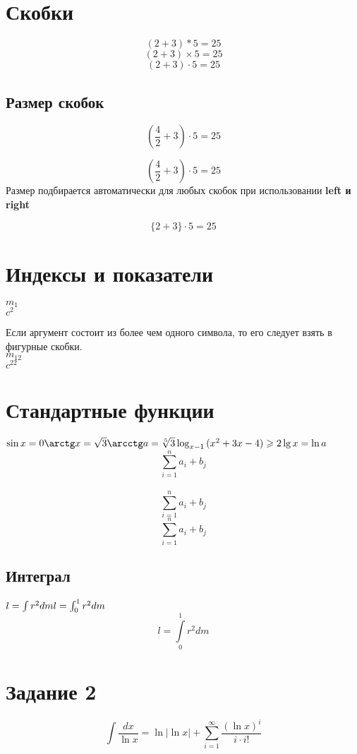 \documentclass[a4paper,12pt]{article} %
\begin{document}
\section {Скобки}

\[(2+3)*5=25 \]
\[(2+3)\times 5=25\]
\[(2+3) \cdot 5=25\]
\subsection*{Размер скобок}
\[(\frac{4}{2}+3) \cdot 5=25\]

\[\left(\frac{4}{2}+3\right) \cdot 5=25\] Размер подбирается автоматически для любых скобок при использовании \textbf{left и right}

\[\{2+3\} \cdot 5=25\]

\section {Индексы и показатели}
$m_1$\\
$c^2$

Если аргумент состоит из более чем одного символа, то его следует взять в фигурные скобки.\\
$m_{12}$\\
$c^{22}$\\

\section {Стандартные функции}
$\sin x=0\\
\arctg x=\sqrt{3}\\
\arcctg a=\sqrt[5]{3}\\
\log_{x-1}{(x^2+3x-4)}\geqslant2\\
\lg x=\ln a $\\
$$ \sum_{i=1}^{n}a_i+b_j $$ \\
\[\sum_{i=1}^{n}a_i+b_j\]
\begin{equation}
\sum_{i=1}^{n}a_i+b_j
\end{equation}

\subsection*{Интеграл}
$ l=\int r^2dm\\
l=\int_{0}^{1}r^2dm $ \\
\[l=\int\limits_{0}^{1}r^2dm\]


\section*{Задание 2}
\[\int\frac{dx}{\ln x} =\ln|\ln x|+ \sum_{i=1}^{\infty}\frac{(\ln x)^i}{i \cdot i!}\]
\end{document}

